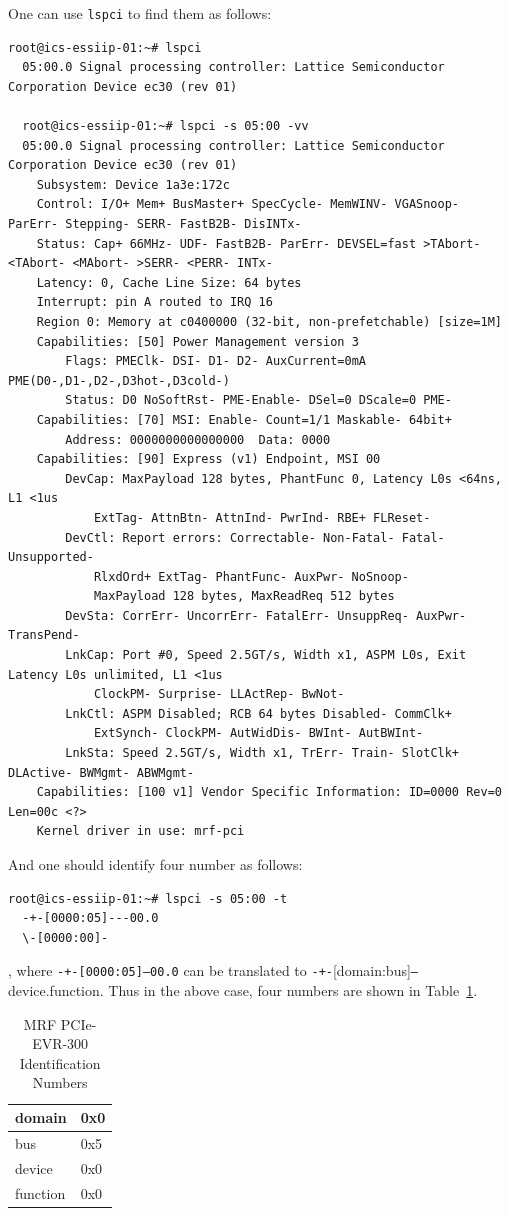 \documentclass[11pt
  , a4paper
  , article
  , oneside
  , showtrims
]{memoir}
\begin{document}
One can use \texttt{lspci} to find them as follows:
\begin{lstlisting}[style=termstyle]
  root@ics-essiip-01:~# lspci
  05:00.0 Signal processing controller: Lattice Semiconductor Corporation Device ec30 (rev 01)

  root@ics-essiip-01:~# lspci -s 05:00 -vv
  05:00.0 Signal processing controller: Lattice Semiconductor Corporation Device ec30 (rev 01)
	Subsystem: Device 1a3e:172c
	Control: I/O+ Mem+ BusMaster+ SpecCycle- MemWINV- VGASnoop- ParErr- Stepping- SERR- FastB2B- DisINTx-
	Status: Cap+ 66MHz- UDF- FastB2B- ParErr- DEVSEL=fast >TAbort- <TAbort- <MAbort- >SERR- <PERR- INTx-
	Latency: 0, Cache Line Size: 64 bytes
	Interrupt: pin A routed to IRQ 16
	Region 0: Memory at c0400000 (32-bit, non-prefetchable) [size=1M]
	Capabilities: [50] Power Management version 3
		Flags: PMEClk- DSI- D1- D2- AuxCurrent=0mA PME(D0-,D1-,D2-,D3hot-,D3cold-)
		Status: D0 NoSoftRst- PME-Enable- DSel=0 DScale=0 PME-
	Capabilities: [70] MSI: Enable- Count=1/1 Maskable- 64bit+
		Address: 0000000000000000  Data: 0000
	Capabilities: [90] Express (v1) Endpoint, MSI 00
		DevCap:	MaxPayload 128 bytes, PhantFunc 0, Latency L0s <64ns, L1 <1us
			ExtTag- AttnBtn- AttnInd- PwrInd- RBE+ FLReset-
		DevCtl:	Report errors: Correctable- Non-Fatal- Fatal- Unsupported-
			RlxdOrd+ ExtTag- PhantFunc- AuxPwr- NoSnoop-
			MaxPayload 128 bytes, MaxReadReq 512 bytes
		DevSta:	CorrErr- UncorrErr- FatalErr- UnsuppReq- AuxPwr- TransPend-
		LnkCap:	Port #0, Speed 2.5GT/s, Width x1, ASPM L0s, Exit Latency L0s unlimited, L1 <1us
			ClockPM- Surprise- LLActRep- BwNot-
		LnkCtl:	ASPM Disabled; RCB 64 bytes Disabled- CommClk+
			ExtSynch- ClockPM- AutWidDis- BWInt- AutBWInt-
		LnkSta:	Speed 2.5GT/s, Width x1, TrErr- Train- SlotClk+ DLActive- BWMgmt- ABWMgmt-
	Capabilities: [100 v1] Vendor Specific Information: ID=0000 Rev=0 Len=00c <?>
	Kernel driver in use: mrf-pci
\end{lstlisting}

And one should identify four number as follows:
\begin{lstlisting}[style=termstyle]
  root@ics-essiip-01:~# lspci -s 05:00 -t
  -+-[0000:05]---00.0
  \-[0000:00]-
\end{lstlisting}
, where \texttt{-+-[0000:05]---00.0} can be translated to \texttt{-+-}[domain:bus]\texttt{---}device.function. Thus in the above case, four numbers are shown in Table~\ref{table:pciidnumber}.\begin{table}[!htb]
  \centering
  \begin{tabular}{l|l}
    \toprule
    domain   & 0x0 \\\midrule
    bus      & 0x5 \\\midrule
    device   & 0x0 \\\midrule
    function & 0x0 \\\bottomrule
  \end{tabular}
  \caption[]{MRF PCIe-EVR-300 Identification Numbers}
  \label{table:pciidnumber}
\end{table}
\end{document}
